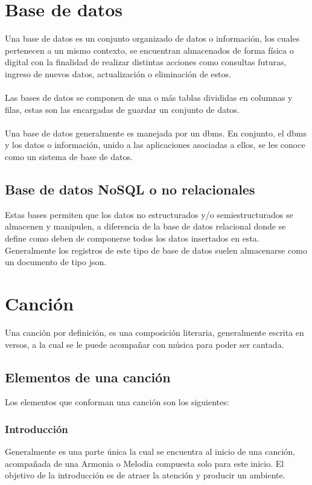 \documentclass[12pt, a4paper, titlepage]{report}
\begin{document}
        \section{Base de datos}
        
        Una base de datos es un conjunto organizado de datos o información, los cuales pertenecen a un mismo contexto, se encuentran almacenados de forma física o digital con la finalidad de realizar distintas acciones como consultas futuras, ingreso de nuevos datos, actualización o eliminación de estos.\\\\
		Las bases de datos se componen de una o más tablas divididas en columnas y filas, estas son las encargadas de guardar un conjunto de datos.\\\\
		Una base de datos generalmente es manejada por un \acrfull{dbms}. En conjunto, el \acrshort{dbms} y los datos o información, unido a las aplicaciones asociadas a ellos, se les conoce como un sistema de base de datos.\cite{refQueEsBD}\par
			\subsection{Base de datos NoSQL o no relacionales}
			Estas bases permiten que los datos no estructurados y/o semiestructurados se almacenen y manipulen, a diferencia de la base de datos relacional donde se define como deben de componerse todos los datos insertados en esta. Generalmente los registros de este tipo de base de datos suelen almacenarse como un documento de tipo \acrshort{json}.\par
		
		\newpage
	    
	    \section{Canción}
	    Una canción por definición, es una composición literaria, generalmente escrita en versos, a la cual se le puede acompañar con música para poder ser cantada.\cite{refEstructuraCancion1}\par
			\subsection{Elementos de una canción}
			Los elementos que conforman una canción son los siguientes:

				\subsubsection*{Introducción}\par
				Generalmente es una parte única la cual se encuentra al inicio de una canción, acompañada de una \gls{Armonia} o \gls{Melodia} compuesta solo para este inicio. El objetivo de la introducción es de atraer la atención y producir un ambiente.\cite{refEstructuraCancion2}\par
\end{document}
